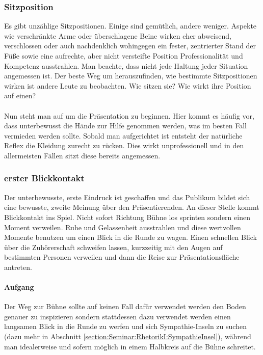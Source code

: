 \documentclass[../main.tex]{subfiles}
\begin{document}
            \subsubsection{Sitzposition}
                Es gibt unzählige Sitzpositionen. Einige sind gemütlich, andere weniger. Aspekte wie verschränkte Arme oder überschlagene Beine wirken eher abweisend, verschlossen oder auch nachdenklich wohingegen ein fester, zentrierter Stand der Füße sowie eine aufrechte, aber nicht versteifte Position Professionalität und Kompetenz ausstrahlen. Man beachte, dass nicht jede Haltung jeder Situation angemessen ist. Der beste Weg um herauszufinden, wie bestimmte Sitzpositionen wirken ist andere Leute zu beobachten. Wie sitzen sie? Wie wirkt ihre Position auf einen?\\
                \\
                Nun steht man auf um die Präsentation zu beginnen. Hier kommt es häufig vor, dass unterbewusst die Hände zur Hilfe genommen werden, was im besten Fall vermieden werden sollte. Sobald man aufgerichtet ist entsteht der natürliche Reflex die Kleidung zurecht zu rücken. Dies wirkt unprofessionell und in den allermeisten Fällen sitzt diese bereits angemessen.
                
            \subsubsection{erster Blickkontakt}
                Der unterbewusste, erste Eindruck ist geschaffen und das Publikum bildet sich eine bewusste, zweite Meinung über den Präsentierenden. An dieser Stelle kommt Blickkontakt ins Spiel. Nicht sofort Richtung Bühne los sprinten sondern einen Moment verweilen. Ruhe und Gelassenheit ausstrahlen und diese wertvollen Momente benutzen um einen Blick in die Runde zu wagen. Einen schnellen Blick über die Zuhörerschaft schweifen lassen, kurzzeitig mit den Augen auf bestimmten Personen verweilen und dann die Reise zur Präsentationsfläche antreten.
                
                \paragraph{Aufgang} Der Weg zur Bühne sollte auf keinen Fall dafür verwendet werden den Boden genauer zu inspizieren sondern stattdessen dazu verwendet werden einen langsamen Blick in die Runde zu werfen und sich Sympathie-Inseln zu suchen (dazu mehr in Abschnitt \ref{section:Seminar:RhetorikI:SympathieInsel}), während man idealerweise und sofern möglich in einem Halbkreis auf die Bühne schreitet.
        
\end{document}
